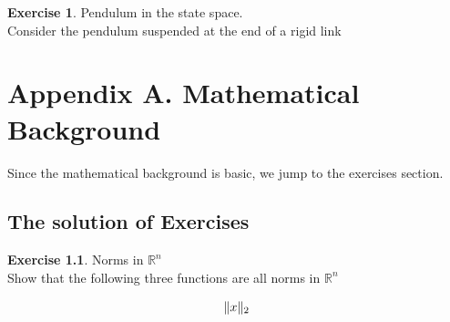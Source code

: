 \documentclass[11pt,a4paper]{report}
\theoremstyle{definition}\newtheorem{exercise}{Exercise}[chapter]
\begin{document}
\begin{exercise} Pendulum in the state space.\\
    Consider the pendulum suspended at the end of a rigid link 
    
\end{exercise}















\chapter{Appendix A. Mathematical Background}
Since the mathematical background is basic, we jump to the exercises section.
\section{The solution of Exercises}
\begin{exercise} Norms in $\mathbb{R}^n$\\
Show that the following three functions are all norms in $\mathbb{R}^n$

\begin{equation}\notag
    \|x\|_2 
\end{equation}

\end{exercise}



\end{document}
